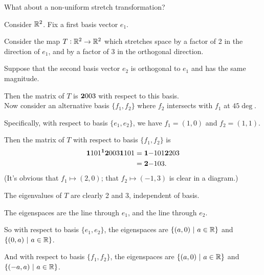 What about a non-uniform stretch transformation?

\newpage
Consider $\mathbb{R}^2$. Fix a first basis vector $e_1$.

Consider the map $T:\mathbb{R}^2\to\mathbb{R}^2$ which stretches space by a factor of 2 in the
direction of $e_1$, and by a factor of 3 in the orthogonal direction.

Suppose that the second basis vector $e_2$ is orthogonal to $e_1$ and has the
same magnitude.

Then the matrix of $T$ is $\mathbf{2}{0}
                               {0}{3}$ with respect to this basis.
~\\

Now consider an alternative basis $\{f_1, f_2\}$ where $f_2$ intersects with
$f_1$ at $45\deg$.

Specifically, with respect to basis $\{e_1, e_2\}$, we have $f_1 = (1, 0)$ and
$f_2 = (1, 1)$.

Then the matrix of $T$ with respect to basis $\{f_1, f_2\}$ is
\begin{align*}
  \mathbf{1}{1}
      {0}{1}^{\mathbf 1} \mathbf{2}{0}
                    {0}{3} \mathbf{1}{1}
                               {0}{1} &=
  \mathbf{1}{-1}
      {0}{1}  \mathbf{2}{2}
                  {0}{3} \\ &=
  \mathbf{2}{-1}
      {0}{3}.
\end{align*}
(It's obvious that $f_1 \mapsto (2, 0)$; that $f_2 \mapsto (-1, 3)$ is clear in
a diagram.)

The eigenvalues of $T$ are clearly 2 and 3, independent of basis.

The eigenspaces are the line through $e_1$, and the line through $e_2$.

So with respect to basis $\{e_1, e_2\}$, the eigenspaces are
$\{(a, 0) ~|~ a \in \mathbb{R}\}$ and $\{(0, a) ~|~ a \in \mathbb{R}\}$.

And with respect to basis $\{f_1, f_2\}$, the eigenspaces are
$\{(a, 0) ~|~ a \in \mathbb{R}\}$ and $\{(-a, a) ~|~ a \in \mathbb{R}\}$.



